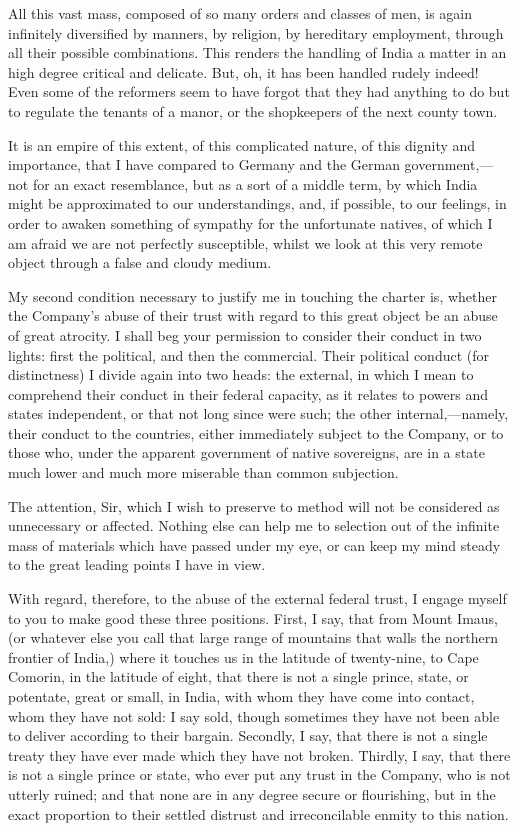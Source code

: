 All this vast mass, composed of so many orders and classes of men, is again infinitely diversified by manners, by religion, by hereditary employment, through all their possible combinations. This renders the handling of India a matter in an high degree critical and delicate. But, oh, it has been handled rudely indeed! Even some of the reformers seem to have forgot that they had anything to do but to regulate the tenants of a manor, or the shopkeepers of the next county town.

It is an empire of this extent, of this complicated nature, of this dignity and importance, that I have compared to Germany and the German government,—not for an exact resemblance, but as a sort of a middle term, by which India might be approximated to our understandings, and, if possible, to our feelings, in order to awaken something of sympathy for the unfortunate natives, of which I am afraid we are not perfectly susceptible, whilst we look at this very remote object through a false and cloudy medium.

My second condition necessary to justify me in touching the charter is, whether the Company's abuse of their trust with regard to this great object be an abuse of great atrocity. I shall beg your permission to consider their conduct in two lights: first the political, and then the commercial. Their political conduct (for distinctness) I divide again into two heads: the external, in which I mean to comprehend their conduct in their federal capacity, as it relates to powers and states independent, or that not long since were such; the other internal,—namely, their conduct to the countries, either immediately subject to the Company, or to those who, under the apparent government of native sovereigns, are in a state much lower and much more miserable than common subjection.

The attention, Sir, which I wish to preserve to method will not be considered as unnecessary or affected. Nothing else can help me to selection out of the infinite mass of materials which have passed under my eye, or can keep my mind steady to the great leading points I have in view.

With regard, therefore, to the abuse of the external federal trust, I engage myself to you to make good these three positions. First, I say, that from Mount Imaus, (or whatever else you call that large range of mountains that walls the northern frontier of India,) where it touches us in the latitude of twenty-nine, to Cape Comorin, in the latitude of eight, that there is not a single prince, state, or potentate, great or small, in India, with whom they have come into contact, whom they have not sold: I say sold, though sometimes they have not been able to deliver according to their bargain. Secondly, I say, that there is not a single treaty they have ever made which they have not broken. Thirdly, I say, that there is not a single prince or state, who ever put any trust in the Company, who is not utterly ruined; and that none are in any degree secure or flourishing, but in the exact proportion to their settled distrust and irreconcilable enmity to this nation.


